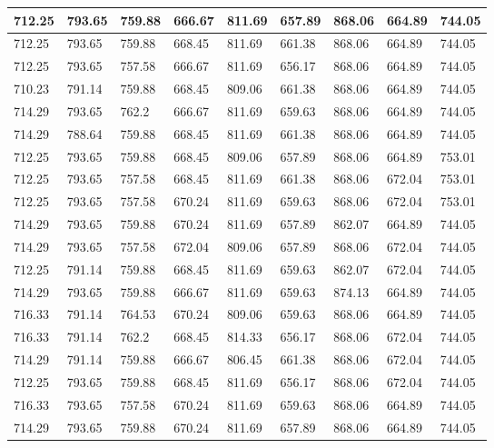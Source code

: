 \begin{longtable}{|l|l|l|l|l|l|l|l|l|}
		712.25   & 793.65  & 759.88  & 666.67  & 811.69 & 657.89  & 868.06   & 664.89  & 744.05  \\ \hline
		712.25   & 793.65  & 759.88  & 668.45  & 811.69 & 661.38  & 868.06   & 664.89  & 744.05  \\ \hline
		712.25   & 793.65  & 757.58  & 666.67  & 811.69 & 656.17  & 868.06   & 664.89  & 744.05  \\ \hline
		710.23   & 791.14  & 759.88  & 668.45  & 809.06 & 661.38  & 868.06   & 664.89  & 744.05  \\ \hline
		714.29   & 793.65  & 762.2   & 666.67  & 811.69 & 659.63  & 868.06   & 664.89  & 744.05  \\ \hline
		714.29   & 788.64  & 759.88  & 668.45  & 811.69 & 661.38  & 868.06   & 664.89  & 744.05  \\ \hline
		712.25   & 793.65  & 759.88  & 668.45  & 809.06 & 657.89  & 868.06   & 664.89  & 753.01  \\ \hline
		712.25   & 793.65  & 757.58  & 668.45  & 811.69 & 661.38  & 868.06   & 672.04  & 753.01  \\ \hline
		712.25   & 793.65  & 757.58  & 670.24  & 811.69 & 659.63  & 868.06   & 672.04  & 753.01  \\ \hline
		714.29   & 793.65  & 759.88  & 670.24  & 811.69 & 657.89  & 862.07   & 664.89  & 744.05  \\ \hline
		714.29   & 793.65  & 757.58  & 672.04  & 809.06 & 657.89  & 868.06   & 672.04  & 744.05  \\ \hline
		712.25   & 791.14  & 759.88  & 668.45  & 811.69 & 659.63  & 862.07   & 672.04  & 744.05  \\ \hline
		714.29   & 793.65  & 759.88  & 666.67  & 811.69 & 659.63  & 874.13   & 664.89  & 744.05  \\ \hline
		716.33   & 791.14  & 764.53  & 670.24  & 809.06 & 659.63  & 868.06   & 664.89  & 744.05  \\ \hline
		716.33   & 791.14  & 762.2   & 668.45  & 814.33 & 656.17  & 868.06   & 672.04  & 744.05  \\ \hline
		714.29   & 791.14  & 759.88  & 666.67  & 806.45 & 661.38  & 868.06   & 672.04  & 744.05  \\ \hline
		712.25   & 793.65  & 759.88  & 668.45  & 811.69 & 656.17  & 868.06   & 672.04  & 744.05  \\ \hline
		716.33   & 793.65  & 757.58  & 670.24  & 811.69 & 659.63  & 868.06   & 664.89  & 744.05  \\ \hline
		714.29   & 793.65  & 759.88  & 670.24  & 811.69 & 657.89  & 868.06   & 664.89  & 744.05  \\ \hline

\end{longtable}
